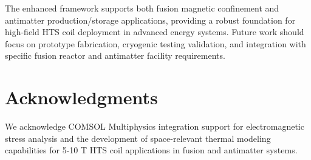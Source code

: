 The enhanced framework supports both fusion magnetic confinement and antimatter production/storage applications, providing a robust foundation for high-field HTS coil deployment in advanced energy systems. Future work should focus on prototype fabrication, cryogenic testing validation, and integration with specific fusion reactor and antimatter facility requirements.

\section*{Acknowledgments}
We acknowledge COMSOL Multiphysics integration support for electromagnetic stress analysis and the development of space-relevant thermal modeling capabilities for 5-10 T HTS coil applications in fusion and antimatter systems.

